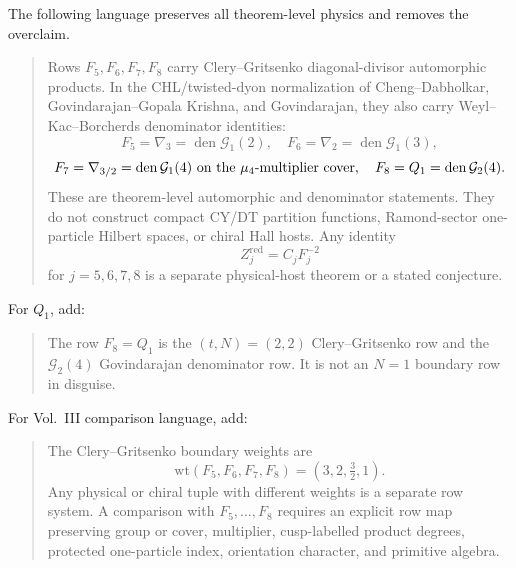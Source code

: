 \begin{proposition}
\label{prop:agent12-paper-safe-language}
The following language preserves all theorem-level physics and removes
the overclaim.

\begin{quote}
Rows \(F_5,F_6,F_7,F_8\) carry Clery--Gritsenko diagonal-divisor
automorphic products.  In the CHL/twisted-dyon normalization of
Cheng--Dabholkar, Govindarajan--Gopala Krishna, and Govindarajan, they
also carry Weyl--Kac--Borcherds denominator identities:
\[
F_5=\nabla_3=\operatorname{den}\mathcal G_1(2),\quad
F_6=\nabla_2=\operatorname{den}\mathcal G_1(3),
\]
\[
F_7=\nabla_{3/2}=\operatorname{den}\mathcal G_1(4)
\ \hbox{on the }\mu_4\hbox{-multiplier cover},\quad
F_8=Q_1=\operatorname{den}\mathcal G_2(4).
\]
These are theorem-level automorphic and denominator statements.  They
do not construct compact CY/DT partition functions, Ramond-sector
one-particle Hilbert spaces, or chiral Hall hosts.  Any identity
\[
Z_j^{\mathrm{red}}=C_jF_j^{-2}
\]
for \(j=5,6,7,8\) is a separate physical-host theorem or a stated
conjecture.
\end{quote}

For \(Q_1\), add:
\begin{quote}
The row \(F_8=Q_1\) is the \((t,N)=(2,2)\) Clery--Gritsenko row and the
\(\mathcal G_2(4)\) Govindarajan denominator row.  It is not an
\(N=1\) boundary row in disguise.
\end{quote}

For Vol.~III comparison language, add:
\begin{quote}
The Clery--Gritsenko boundary weights are
\[
\mathrm{wt}(F_5,F_6,F_7,F_8)=(3,2,\tfrac32,1).
\]
Any physical or chiral tuple with different weights is a separate row
system.  A comparison with \(F_5,\ldots,F_8\) requires an explicit row
map preserving group or cover, multiplier, cusp-labelled product
degrees, protected one-particle index, orientation character, and
primitive algebra.
\end{quote}
\end{proposition}

